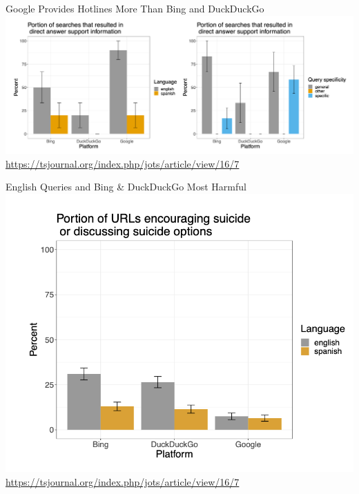 \documentclass[nobackground,dvipsnames,table]{beamer}
\begin{document}
\begin{frame}{Google Provides Hotlines More Than Bing and DuckDuckGo}
    \centering
    \includegraphics[width=\textwidth]{hsehsq-more-hotlines-provided}
    \tiny
    \url{https://tsjournal.org/index.php/jots/article/view/16/7}
\end{frame}

\begin{frame}{English Queries and Bing \& DuckDuckGo Most Harmful}
    \centering
    \includegraphics[height=0.75\textheight]{hsehsq-harmful-results}
    \tiny
    \url{https://tsjournal.org/index.php/jots/article/view/16/7}
\end{frame}
\end{document}
